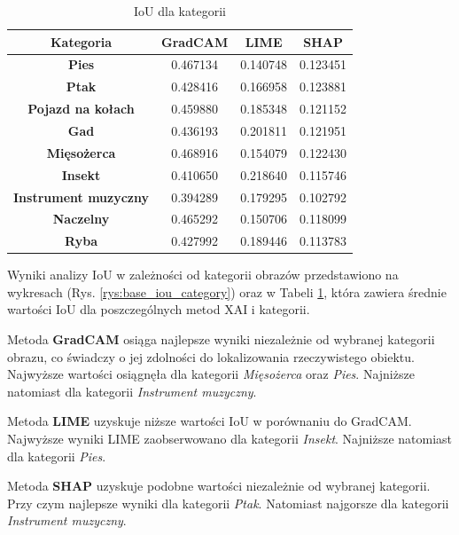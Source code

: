 \begin{table}[h]
	\centering
	\begin{tabular}{|c|c|c|c|}
		\hline
		\textbf{Kategoria}           & \textbf{GradCAM} & \textbf{LIME} & \textbf{SHAP} \\
		\hline
		\textbf{Pies}                & 0.467134         & 0.140748      & 0.123451      \\
		\hline
		\textbf{Ptak}                & 0.428416         & 0.166958      & 0.123881      \\
		\hline
		\textbf{Pojazd na kołach}    & 0.459880         & 0.185348      & 0.121152      \\
		\hline
		\textbf{Gad}                 & 0.436193         & 0.201811      & 0.121951      \\
		\hline
		\textbf{Mięsożerca}          & 0.468916         & 0.154079      & 0.122430      \\
		\hline
		\textbf{Insekt}              & 0.410650         & 0.218640      & 0.115746      \\
		\hline
		\textbf{Instrument muzyczny} & 0.394289         & 0.179295      & 0.102792      \\
		\hline
		\textbf{Naczelny}            & 0.465292         & 0.150706      & 0.118099      \\
		\hline
		\textbf{Ryba}                & 0.427992         & 0.189446      & 0.113783      \\
		\hline
	\end{tabular}
	\caption{IoU dla kategorii}
	\label{tab:base_iou_category}
\end{table}

Wyniki analizy IoU w zależności od kategorii obrazów przedstawiono na wykresach (Rys. \ref{rys:base_iou_category}) oraz w Tabeli \ref{tab:base_iou_category}, która zawiera średnie wartości IoU dla poszczególnych metod XAI i kategorii.

Metoda \textbf{GradCAM} osiąga najlepsze wyniki niezależnie od wybranej kategorii obrazu, co świadczy o jej zdolności do lokalizowania rzeczywistego obiektu.
Najwyższe wartości osiągnęła dla kategorii \textit{Mięsożerca} oraz \textit{Pies}.
Najniższe natomiast dla kategorii \textit{Instrument muzyczny}.

Metoda \textbf{LIME} uzyskuje niższe wartości IoU w porównaniu do GradCAM.
Najwyższe wyniki LIME zaobserwowano dla kategorii \textit{Insekt}.
Najniższe natomiast dla kategorii \textit{Pies}.

Metoda \textbf{SHAP} uzyskuje podobne wartości niezależnie od wybranej kategorii.
Przy czym najlepsze wyniki dla kategorii \textit{Ptak}.
Natomiast najgorsze dla kategorii \textit{Instrument muzyczny}.

